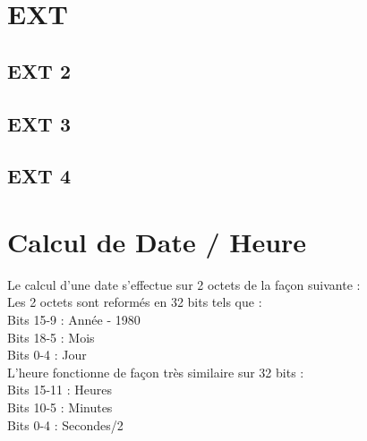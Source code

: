 \documentclass[11pt]{report}
\begin{document}
\chapter{EXT}

\section{EXT 2}

\section{EXT 3}

\section{EXT 4}

\appendix
\chapter{Calcul de Date / Heure}
Le calcul d'une date s'effectue sur 2 octets de la façon suivante : \\
Les 2 octets sont reformés en 32 bits tels que : \\
Bits 15-9 : Année - 1980 \\
Bits 18-5 : Mois \\
Bits 0-4 : Jour \\
L'heure fonctionne de façon très similaire sur 32 bits : \\
Bits 15-11 : Heures \\
Bits 10-5 : Minutes \\
Bits 0-4 : Secondes/2 \\
\end{document}
